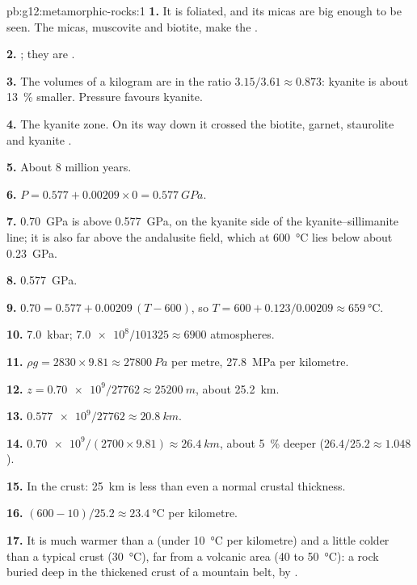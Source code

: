 \begin{solution}{pb:g12:metamorphic-rocks:1}
\textbf{1.} It is foliated, and its micas are big enough to be seen. The
micas, muscovite and biotite, make the .

\textbf{2.} ; they are .

\textbf{3.} The volumes of a kilogram are in the ratio $3.15/3.61 \approx
0.873$: kyanite is about \qty{13}{\percent} smaller. Pressure favours
kyanite.

\textbf{4.} The kyanite zone. On its way down it crossed the biotite,
garnet, staurolite and kyanite .

\textbf{5.} About 8 million years.

\textbf{6.} $P = 0.577 + 0.00209 \times 0 = \qty{0.577}{GPa}$.

\textbf{7.} \qty{0.70}{GPa} is above \qty{0.577}{GPa}, on the kyanite side of
the kyanite--sillimanite line; it is also far above the andalusite field,
which at \qty{600}{\celsius} lies below about \qty{0.23}{GPa}.

\textbf{8.} \qty{0.577}{GPa}.

\textbf{9.} $0.70 = 0.577 + 0.00209\,(T - 600)$, so $T = 600 +
0.123/0.00209 \approx \qty{659}{\celsius}$.

\textbf{10.} \qty{7.0}{kbar}; $\num{7.0e8}/101325 \approx \num{6900}$
atmospheres.

\textbf{11.} $\rho g = 2830 \times 9.81 \approx \qty{27800}{Pa}$ per metre,
\qty{27.8}{MPa} per kilometre.

\textbf{12.} $z = \num{0.70e9}/\num{27762} \approx \qty{25200}{m}$, about
\qty{25.2}{km}.

\textbf{13.} $\num{0.577e9}/\num{27762} \approx \qty{20.8}{km}$.

\textbf{14.} $\num{0.70e9}/(2700 \times 9.81) \approx \qty{26.4}{km}$, about
\qty{5}{\percent} deeper ($26.4/25.2 \approx 1.048$).

\textbf{15.} In the crust: \qty{25}{km} is less than even a normal crustal
thickness.

\textbf{16.} $(600 - 10)/25.2 \approx \qty{23.4}{\celsius}$ per kilometre.

\textbf{17.} It is much warmer than a  (under
\qty{10}{\celsius} per kilometre) and a little colder than a typical crust
(\qty{30}{\celsius}), far from a volcanic area (40 to \qty{50}{\celsius}): a
rock buried deep in the thickened crust of a mountain belt, by .


\end{solution}
